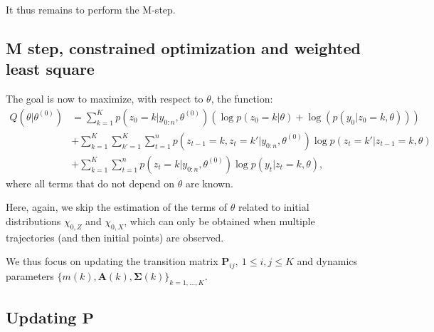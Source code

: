 \documentclass[]{book}
\begin{document}
It thus remains to perform the M-step.

\hypertarget{m-step-constrained-optimization-and-weighted-least-square}{%
\subsection{M step, constrained optimization and weighted least square}\label{m-step-constrained-optimization-and-weighted-least-square}}

The goal is now to maximize, with respect to \(\theta\), the function:
\begin{align*}
Q(\theta \vert \theta^{(0)})&= \sum_{k = 1}^K p(z_0 = k \vert y_{0:n}, \theta^{(0)})\left(\log p(z_0 = k \vert \theta) + \log(p(y_0 \vert z_0 = k, \theta))\right)  \nonumber \\
& + \sum_{k = 1}^K\sum_{k' = 1}^K \sum_{t = 1}^n p(z_{t-1} = k, z_{t} = k'\vert y_{0:n}, \theta^{(0)}) \log p(z_{t} = k' \vert z_{t - 1} = k,\theta) \nonumber \\
& + \sum_{k = 1}^K \sum_{t = 1}^n p(z_t = k\vert y_{0:n}, \theta^{(0)}) \log p(y_{t} \vert z_{t} = k, \theta), \nonumber
\end{align*}
where all terms that do not depend on \(\theta\) are known.

Here, again, we skip the estimation of the terms of \(\theta\) related to initial distributions \(\chi_{0,Z}\) and \(\chi_{0, X}\), which can only be obtained when multiple trajectories (and then initial points) are observed.

We thus focus on updating the transition matrix \(\mathbf{P}_{ij},~1\leq i, j \leq K\) and dynamics parameters \(\lbrace m(k), \mathbf{A}(k), \mathbf{\Sigma}(k)\rbrace_{k = 1,\dots, K}\).

\hypertarget{updating-mathbfp}{%
\subsection*{\texorpdfstring{Updating \(\mathbf{P}\)}{Updating \textbackslash{}mathbf\{P\}}}\label{updating-mathbfp}}
\end{document}
